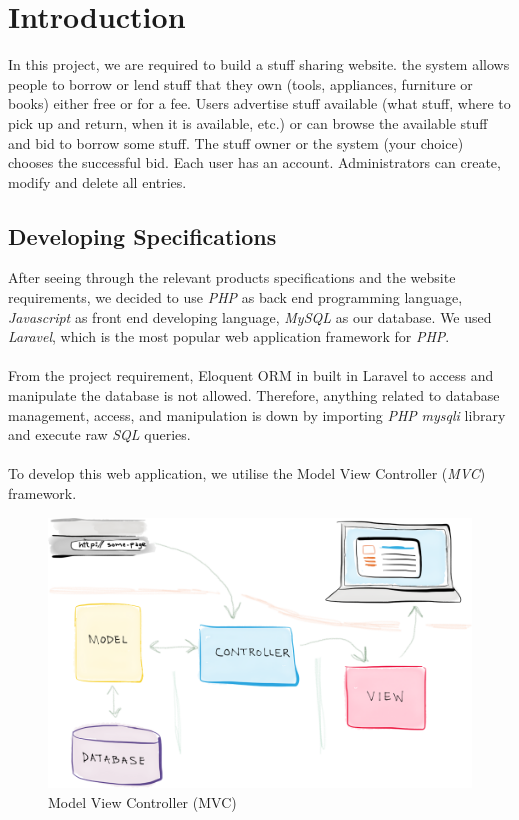 \tableofcontents
\newpage

\section{Introduction}
In this project, we are required to build a stuff sharing website. the system allows people to borrow or lend stuff that they own (tools, appliances, furniture or books) either free or for a fee. Users advertise stuff available (what stuff, where to pick up and return, when it is available, etc.) or can browse the available stuff and bid to borrow some stuff. The stuff owner or the system (your choice) chooses the successful bid. Each user has an account. Administrators can create, modify and delete all entries.
\subsection{Developing Specifications}

After seeing through the relevant products specifications and the website requirements, we decided to use \textit{PHP} as back end programming language, \textit{Javascript} as front end developing language, \textit{MySQL} as our database. We used \textit{Laravel}, which is the most popular web application framework for \textit{PHP}.\\
\\
From the project requirement, Eloquent ORM in built in Laravel to access and manipulate the database is not allowed. Therefore, anything related to database management, access, and manipulation is down by importing \textit{PHP} \textit{mysqli} library and execute raw \textit{SQL} queries.\\
\\
To develop this web application, we utilise the Model View Controller (\textit{MVC}) framework.\\

\begin{figure}[h]
      \centering
	\includegraphics[scale=0.2]{MVC_framework.png}
      \caption{Model View Controller (MVC)}
\end{figure}

